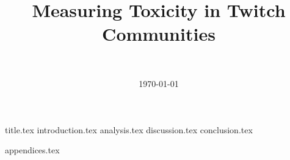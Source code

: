 \documentclass[final]{report}
\title{Measuring Toxicity in Twitch Communities}
\author{~}
\date{\today}
\begin{document}

{title.tex}
\newpage
{}\label{ch:contents}
\tableofcontents
\newpage
{}
{introduction.tex}
{analysis.tex}
{discussion.tex}
{conclusion.tex}
\newpage
{}

\printbibliography
{appendices.tex}
\end{document}
